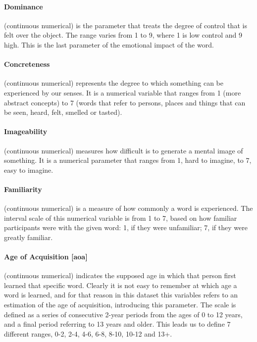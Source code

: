 \documentclass[a4paper,11pt,dvipsnames]{article}
\begin{document}
\paragraph{Dominance} (continuous numerical) is the parameter that treats the degree of control that is felt over the object. The range varies from 1 to 9, where 1 is low control and 9 high. This is the last parameter of the emotional impact of the word.
%
%
\paragraph{Concreteness} (continuous numerical) represents the degree to which something can be experienced by our senses. It is a numerical variable that ranges from 1 (more abstract concepts) to 7 (words that refer to persons, places and things that can be seen, heard, felt, smelled or tasted).

\paragraph{Imageability} (continuous numerical) measures how difficult is to generate a mental image of something. It is a numerical parameter that ranges from 1, hard to imagine, to 7, easy to imagine. 

\paragraph{Familiarity} (continuous numerical) is a measure of how commonly a word is experienced. The interval scale of this numerical variable is from 1 to 7, based on how familiar participants were with the given word: 1, if they were unfamiliar; 7, if they were greatly familiar. 


\paragraph{Age of Acquisition [aoa]} (continuous numerical) indicates the supposed age in which that person first learned that specific word. Clearly it is not easy to remember at which age a word is learned, and for that reason in this dataset this variables refers to an estimation of the age of acquisition, introducing this parameter. The scale is defined as a series of consecutive 2-year periods from the ages of 0 to 12 years, and a final period referring to 13 years and older. This leads us to define 7 different ranges, 0-2, 2-4, 4-6, 6-8, 8-10, 10-12 and 13+.
\end{document}
